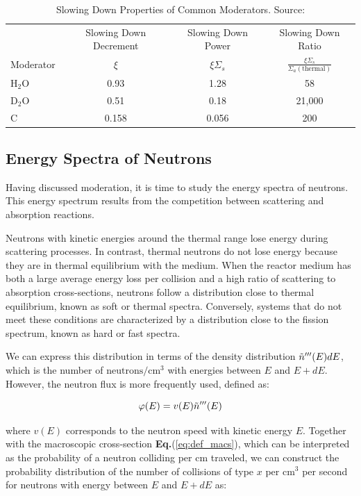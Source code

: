 \begin{table}[h]
    \caption{Slowing Down Properties of Common Moderators. Source: \cite{Lewis_2014}}
        \begin{tabular}{lccc}
            \toprule
            & Slowing Down Decrement  & Slowing Down Power  & Slowing Down Ratio \\
            \multirow{1}{*}{Moderator}
            & $\xi$ & $\xi\Sigma_s$ & $\frac{\xi\Sigma_s}{\Sigma_a (\text{thermal})}$ \\
            \midrule
            H$_2$O & 0.93 & 1.28 & 58 \\
            D$_2$O & 0.51 & 0.18 & 21,000 \\
            C      & 0.158 & 0.056 & 200 \\
            \bottomrule
        \end{tabular}
\end{table}

\subsection{Energy Spectra of Neutrons}

Having discussed moderation, it is time to study the energy spectra of neutrons. This energy spectrum results from the competition between scattering and absorption reactions.

Neutrons with kinetic energies around the thermal range lose energy during scattering processes. In contrast, thermal neutrons do not lose energy because they are in thermal equilibrium with the medium. When the reactor medium has both a large average energy loss per collision and a high ratio of scattering to absorption cross-sections, neutrons follow a distribution close to thermal equilibrium, known as soft or thermal spectra. Conversely, systems that do not meet these conditions are characterized by a distribution close to the fission spectrum, known as hard or fast spectra.

We can express this distribution in terms of the density distribution $\Tilde{n}'''(E)dE$, which is the number of $\text{neutrons}/\text{cm}^{3}$ with energies between $E$ and $E + dE$. However, the neutron flux is more frequently used, defined as:

\begin{equation}
    \varphi(E) = v(E)\Tilde{n}'''(E)
    \label{eq:neutron_flux}
\end{equation}

where \(v(E)\) corresponds to the neutron speed with kinetic energy \(E\). Together with the macroscopic cross-section \textbf{Eq.}(\ref{eq:def_macs}), which can be interpreted as the probability of a neutron colliding per cm traveled, we can construct the probability distribution of the number of collisions of type \(x\) per \(\text{cm}^{3}\) per second for neutrons with energy between $E$ and $E + dE$ as:

